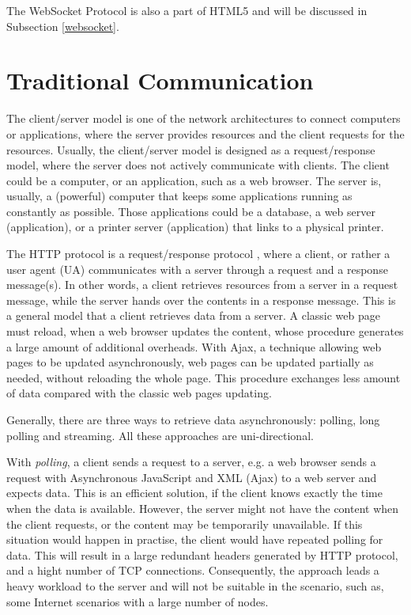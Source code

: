 The WebSocket Protocol is also a part of HTML5 and will be discussed in Subsection \ref{websocket}.

\section{Traditional Communication}

The client/server model is one of the network architectures to connect computers or applications, where the server provides resources and the client requests for the resources. Usually, the client/server model is designed as a request/response model, where the server does not actively communicate with clients. The client could be a computer, or an application, such as a web browser. The server is, usually, a (powerful) computer that keeps some applications running as constantly as possible. Those applications could be a database, a web server (application), or a printer server (application) that links to a physical printer. 

The HTTP protocol is a request/response protocol \cite{fielding1999hypertext}, where a client, or rather a user agent (UA) communicates with a server through a request and a response message(s). In other words, a client retrieves resources from a server in a request message, while the server hands over the contents in a response message. This is a general model that a client retrieves data from a server. A classic web page must reload, when a web browser updates the content, whose procedure generates a large amount of additional overheads. With Ajax, a technique allowing web pages to be updated asynchronously, web pages can be updated partially as needed, without reloading the whole page. This procedure exchanges less amount of data compared with the classic web pages updating. 

Generally, there are three ways to retrieve data asynchronously\cite{lubbers2010html5}: polling, long polling and streaming. All these approaches are uni-directional. 

With \emph{polling}, a client sends a request to a server, e.g. a web browser sends a request with Asynchronous JavaScript and XML (Ajax) \cite{garrett2005ajax} to a web server and expects data. This is an efficient solution, if the client knows exactly the time when the data is available. However, the server might not have the content when the client requests, or the content may be temporarily unavailable. If this situation would happen in practise, the client would have repeated polling for data. This will result in a large redundant headers generated by HTTP protocol, and a hight number of TCP connections. Consequently, the approach leads a heavy workload to the server and will not be suitable in the scenario, such as, some Internet scenarios with a large number of nodes. 

